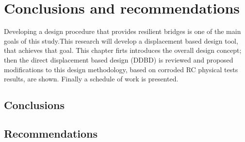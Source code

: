 \chapter{Conclusions and recommendations}
Developing a design procedure that provides resilient bridges is one of the main goals of this study.This research will develop a displacement based design tool, that achieves that goal. This chapter firts introduces the overall design concept; then the direct displacement based design (DDBD) is reviewed and proposed modifications to this design methodology, based on corroded RC physical tests results, are shown. Finally a schedule of work is presented.

\section{Conclusions}
\section{Recommendations}
